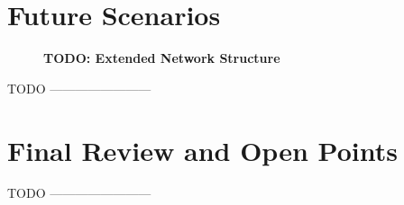 \section{Future Scenarios}
\label{sec:future-scene}

\begin{figure}[htbp]
  \centering
  \caption{\bf\small TODO: Extended Network Structure}
  \label{fig:prototype-net-ext}
\end{figure}

TODO ------------------------

\section{Final Review and Open Points}

TODO ------------------------